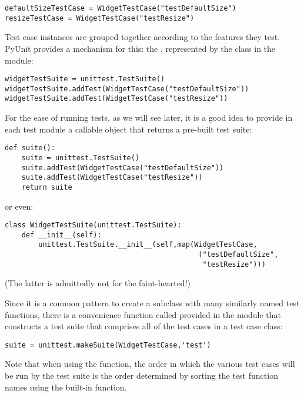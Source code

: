 \begin{verbatim}
defaultSizeTestCase = WidgetTestCase("testDefaultSize")
resizeTestCase = WidgetTestCase("testResize")
\end{verbatim}

Test case instances are grouped together according to the features
they test.  PyUnit provides a mechanism for this: the , represented by the class  in the
 module:

\begin{verbatim}
widgetTestSuite = unittest.TestSuite()
widgetTestSuite.addTest(WidgetTestCase("testDefaultSize"))
widgetTestSuite.addTest(WidgetTestCase("testResize"))
\end{verbatim}

For the ease of running tests, as we will see later, it is a good
idea to provide in each test module a callable object that returns a
pre-built test suite:

\begin{verbatim}
def suite():
    suite = unittest.TestSuite()
    suite.addTest(WidgetTestCase("testDefaultSize"))
    suite.addTest(WidgetTestCase("testResize"))
    return suite
\end{verbatim}

or even:

\begin{verbatim}
class WidgetTestSuite(unittest.TestSuite):
    def __init__(self):
        unittest.TestSuite.__init__(self,map(WidgetTestCase,
                                              ("testDefaultSize",
                                               "testResize")))
\end{verbatim}

(The latter is admittedly not for the faint-hearted!)

Since it is a common pattern to create a  subclass
with many similarly named test functions, there is a convenience
function called  provided in the
 module that constructs a test suite that
comprises all of the test cases in a test case class:

\begin{verbatim}
suite = unittest.makeSuite(WidgetTestCase,'test')
\end{verbatim}

Note that when using the  function, the order in
which the various test cases will be run by the test suite is the
order determined by sorting the test function names using the
 built-in function.

